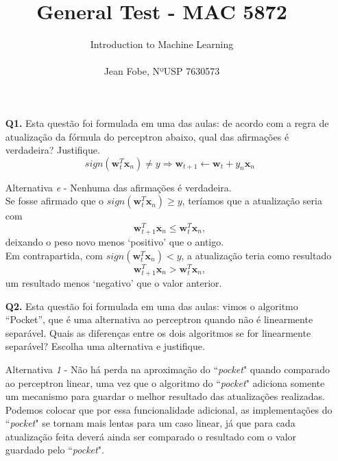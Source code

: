 \documentclass[12pt]{article}
\begin{document}
 
 
\title{General Test - MAC 5872}
\thispagestyle{fancy}
\author{
	Introduction to Machine Learning\\\\
    Jean Fobe, NºUSP 7630573
    }

\maketitle

\begin{enumerate}

\item [\textbf{Q1.}] Esta questão foi formulada em uma das aulas: de acordo com a regra de atualização da fórmula do perceptron abaixo, qual das afirmações é verdadeira? Justifique. \[sign(\mathbf{w}_t^T \mathbf{x}_n) \ne y \Rightarrow \mathbf{w}_{t+1} \leftarrow \mathbf{w}_t + y_n \mathbf{x}_n\]
	\begin{addmargin}[1em]{2em}%
		Alternativa \textit{e} - Nenhuma das afirmações é verdadeira. \\
		Se fosse afirmado que o $sign(\mathbf{w}_t^T \mathbf{x}_n) \geq y$, teríamos que a atualização seria com \[\mathbf{w}_{t+1}^T \mathbf{x}_n \leq \mathbf{w}_t^T \mathbf{x}_n,\] deixando o peso novo menos `positivo' que o antigo. \\
		Em contrapartida, com $sign(\mathbf{w}_t^T \mathbf{x}_n) < y$, a atualização teria como resultado \[\mathbf{w}_{t+1}^T \mathbf{x}_n > \mathbf{w}_t^T \mathbf{x}_n,\] um resultado menos `negativo' que o valor anterior.
	\end{addmargin}
     
\item [\textbf{Q2.}] Esta questão foi formulada em uma das aulas: vimos o algoritmo ``Pocket'', que é uma alternativa ao perceptron quando  não é linearmente separável. Quais as diferenças entre os dois algoritmos se  for linearmente separável? Escolha uma alternativa e justifique. 
	\begin{addmargin}[1em]{2em}%
		Alternativa \textit{1} - Não há perda na aproximação do ``\textit{pocket}" quando comparado ao perceptron linear, uma vez que o algoritmo do ``\textit{pocket}" adiciona somente um mecanismo para guardar o melhor resultado das atualizações realizadas. Podemos colocar que por essa funcionalidade adicional, as implementações do ``\textit{pocket}" se tornam mais lentas para um caso linear, já que para cada atualização feita  deverá ainda ser comparado o resultado com o valor guardado pelo ``\textit{pocket}".
	\end{addmargin}


\end{enumerate}
\end{document}
